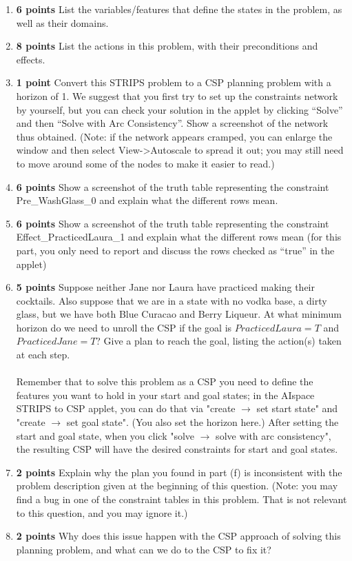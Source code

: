 \documentclass{article}
\begin{document}
\begin{enumerate}[label=(\alph*)]
    \item \textbf{6 points} List the variables/features that define the states in the problem, as well as their domains.
    \item \textbf{8 points} List the actions in this problem, with their preconditions and effects.
    \item \textbf{1 point} Convert this STRIPS problem to a CSP planning problem with a horizon of 1. We suggest that you first try to set up the constraints network by yourself, but you can check your solution in the applet by clicking “Solve” and then “Solve with Arc Consistency”. Show a screenshot of the network thus obtained. (Note: if the network appears cramped, you can enlarge the window and then select View->Autoscale to spread it out; you may still need to move around some of the nodes to make it easier to read.)
    \item \textbf{6 points} Show a screenshot of the truth table representing the constraint Pre\_WashGlass\_0 and explain what the different rows mean. 
    \item \textbf{6 points} Show a screenshot of the truth table representing the constraint Effect\_PracticedLaura\_1 and explain what the different rows mean (for this part, you only need to report and discuss the rows checked as “true” in the applet)
    \item \textbf{5 points} Suppose neither Jane nor Laura have practiced making their cocktails. Also suppose that we are in a state with no vodka base, a dirty glass, but we have both Blue Curacao and Berry Liqueur. At what minimum horizon do we need to unroll the CSP if the goal is $PracticedLaura = T$ and $PracticedJane = T$? Give a plan to reach the goal, listing the action(s) taken at each step. \\ \\ Remember that to solve this problem as a CSP you need to define the features you want to hold in your start and goal states; in the AIspace STRIPS to CSP applet, you can do that via "create $\rightarrow$ set start state" and "create $\rightarrow$ set goal state". (You also set the horizon here.) After setting the start and goal state, when you click "solve $\rightarrow$ solve with arc consistency", the resulting CSP will have the desired constraints for start and goal states.
    \item \textbf{2 points} Explain why the plan you found in part (f) is inconsistent with the problem description given at the beginning of this question. (Note: you may find a bug in one of the constraint tables in this problem. That is not relevant to this question, and you may ignore it.)
    \item \textbf{2 points} Why does this issue happen with the CSP approach of solving this planning problem, and what can we do to the CSP to fix it?
\end{enumerate}
\end{document}
